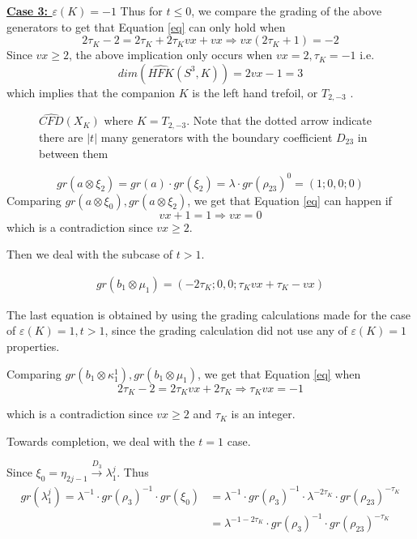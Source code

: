 \documentclass[11pt,reqno]{amsart}
\theoremstyle{definition}
\newtheorem *{remark}{Remark}
\newcommand{\hfkhat}{\widehat{\mathit{HFK}}}
\newcommand{\cfdhat}{\widehat{\mathit{CFD}}}
\begin{document}
\begin{subsection}{\underline{\textbf{Case 3: $\varepsilon(K)=-1$}}}
Thus for $t \leq 0$, we compare the grading of the above generators to get that Equation \ref{eq} can only hold when 
\[2\tau_K - 2 = 2\tau_K + 2\tau_Kvx+vx \Rightarrow vx(2\tau_K+1) = -2\]
Since $vx \geq 2$, the above implication only occurs when $vx=2, \tau_K=-1$ i.e. \[dim(\hfkhat(S^3, K)) = 2vx-1=3\] which implies that the companion $K$ is the left hand trefoil, or $T_{2,-3}$ \cite{balvel}.


\begin{figure}[ht]
    \centering
   \caption{$\cfdhat(X_K)$ where $K = T_{2,-3}$. Note that the dotted arrow indicate there are $|t|$ many generators with the boundary coefficient $D_{23}$ in between them}
\end{figure}


\[gr(a\otimes \xi_2) = gr(a) \cdot gr(\xi_2) = \lambda \cdot gr(\rho_{23})^{0} = (1;0,0;0)\] Comparing $gr(a\otimes \xi_0), gr(a \otimes \xi_2)$, we get that Equation \ref{eq} can happen if \[vx+1=1 \Rightarrow vx=0\] which is a contradiction since $vx \geq 2$.

Then we deal with the subcase of $t >1$. 

\begin{align*}
    gr(b_1 \otimes \mu_1) = (-2\tau_K; 0,0; \tau_Kvx + \tau_K - vx)
\end{align*}

The last equation is obtained by using the grading calculations made for the case of $\varepsilon(K) = 1, t > 1$, since the grading calculation did not use any of $\varepsilon(K)=1$ properties.


Comparing $gr(b_1 \otimes \kappa^1_1), gr(b_1 \otimes \mu_1)$, we get that Equation \ref{eq} when \[2\tau_K - 2 = 2\tau_Kvx+ 2\tau_K \Rightarrow \tau_Kvx = -1\]

which is a contradiction since $vx \geq 2$ and $\tau_K$ is an integer.

Towards completion, we deal with the $t=1$ case. 

 Since $\xi_0= \eta_{2j-1} \xrightarrow{D_3} \lambda_1^j$. Thus 
\begin{align*}
 gr(\lambda^j_1) = \lambda^{-1}\cdot gr(\rho_3)^{-1} \cdot gr(\xi_0) &= \lambda^{-1}\cdot gr(\rho_3)^{-1} \cdot \lambda^{-2\tau_K}\cdot gr(\rho_{23})^{-\tau_K} \\
 &=\lambda^{-1-2\tau_K} \cdot gr(\rho_3)^{-1} \cdot gr(\rho_{23})^{-\tau_K}   
\end{align*}


\end{subsection}
\end{document}
